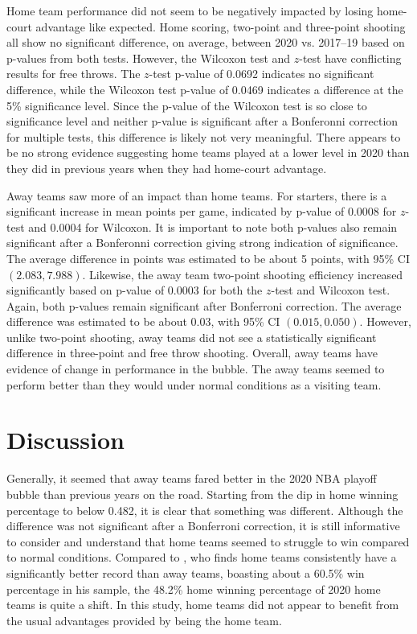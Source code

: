 \documentclass[10pt]{article}
\begin{document}
Home team performance did not seem to be negatively impacted by losing home-court
advantage like expected. Home scoring, two-point and three-point
shooting all show no significant difference, on average, between 2020 vs.
2017--19 based on p-values from both tests. However, the Wilcoxon test and \(z\)-test have conflicting results
for free throws. The \(z\)-test p-value of 0.0692 indicates no significant difference, while
the Wilcoxon test p-value of 0.0469 indicates a difference at the 5\% significance level. Since
the p-value of the Wilcoxon test is so close to significance level and neither p-value is significant
after a Bonferonni correction for multiple tests, this difference is likely not very meaningful.
There appears to be no strong evidence suggesting home teams played at
a lower level in 2020 than they did in previous years when they had home-court advantage.

Away teams saw more of an impact than home teams. For starters, there is a
significant increase in mean points per game, indicated by p-value of 0.0008 for \(z\)-test and
0.0004 for Wilcoxon. It is important to note both p-values also remain significant after
a Bonferonni correction giving strong indication of significance. The
average difference in points was estimated to
be about 5 points, with 95\% CI \((2.083, 7.988)\). Likewise, the away team two-point
shooting efficiency increased significantly based on p-value of 0.0003
for both the \(z\)-test and Wilcoxon test. Again, both p-values remain significant after Bonferroni correction.
The average difference was estimated to be about 0.03, with 95\% CI \((0.015, 0.050)\). However,
unlike two-point shooting, away teams did not see a statistically significant difference in three-point and free
throw shooting. Overall, away teams have evidence of change in performance in
the bubble. The away teams seemed to perform better than they would under normal
conditions as a visiting team.

\section{Discussion}

Generally, it seemed that away teams fared better in the 2020 NBA playoff bubble
than previous years on the road. Starting from the dip in home winning percentage to
below 0.482, it is clear that something was different. Although the difference
was not significant after a Bonferroni correction, it is still informative to 
consider and understand that home teams seemed to struggle to win compared to
normal conditions. Compared to \citet{Kotecki}, who finds home teams consistently 
have a significantly better record than away teams, boasting about a 60.5\% win 
percentage in his sample, the 48.2\% home winning percentage of 2020 home teams 
is quite a shift. In this study, home teams did not appear to benefit from the 
usual advantages provided by being the home team.
\end{document}
